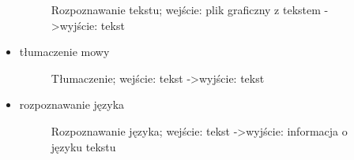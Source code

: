 \begin{itemize}
\begin{figure}[!h]
			\caption{Rozpoznawanie tekstu; wejście: plik graficzny z tekstem -\textgreater wyjście: tekst}\label{fig:hub_and_spoke}
		\end{figure}
	\item tłumaczenie mowy
		\setlength\fboxsep{20pt}
		\setlength\fboxrule{1pt}
		\begin{figure}[!h]
			\centering
			\caption{Tłumaczenie; wejście: tekst -\textgreater wyjście: tekst}\label{fig:hub_and_spoke}
		\end{figure}
\newpage
	\item rozpoznawanie języka
		\setlength\fboxsep{20pt}
		\setlength\fboxrule{1pt}
		\begin{figure}[!h]
			\centering
			\caption{Rozpoznawanie języka; wejście: tekst -\textgreater wyjście: informacja o języku tekstu}\label{fig:hub_and_spoke}
		\end{figure}
\end{itemize} 

